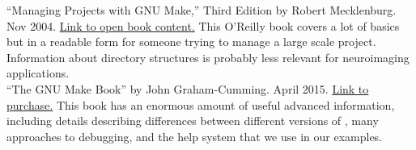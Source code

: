 ``Managing Projects with GNU Make,'' Third Edition by Robert Mecklenburg. Nov 2004. \href{http://www.oreilly.com/openbook/make3/book/index.csp}{Link to open book content.} This O'Reilly book covers a lot of basics but in a readable form for someone trying to manage a large scale project. Information about directory structures is probably less relevant for neuroimaging applications. 
\\

``The GNU Make Book'' by John Graham-Cumming. April 2015. \href{https://www.nostarch.com/gnumake}{Link to purchase.} This book has an enormous amount of useful advanced information, including details describing differences between different versions of \maken{}, many approaches to debugging, and the help system that we use in our examples. 
